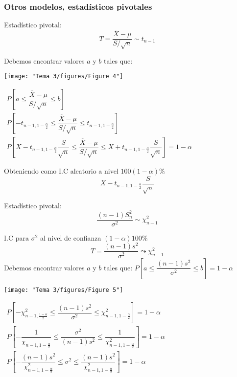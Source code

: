 \subsubsection{Otros modelos, estadísticos pivotales}
 \begin{tcolorbox}[colback=blue!5!white, colframe=blue!75!black, title=\textbf{$X\sim \mathcal{N}(\mu,\sigma^2)$, estimamos $\mu,\sigma$ desconocida}]
Estadístico pivotal: \[
T=\dfrac{\overline{X}-\mu}{S / \sqrt{n} }\sim t_{n-1}
\] 
\end{tcolorbox}

Debemos encontrar valores $a$ y $b$ tales que:

\begin{minipage}{0.45\textwidth}
    \texttt{[image: "Tema 3/figures/Figure 4"]}
\end{minipage}$\begin{array}{l}
    P\left[ a\le \dfrac{\overline{X}-\mu}{S / \sqrt{n} }\le b \right] \\
    P\left[ -t_{n-1,1-\frac{\alpha}{2}}\le \dfrac{\overline{X}-\mu}{S / \sqrt{n} }\le t_{n-1,1-\frac{\alpha}{2} } \right] \\
    P\left[ X-t_{n-1,1-\frac{\alpha}{2} }\dfrac{S}{\sqrt{n} }\le \dfrac{\overline{X}-\mu}{S / \sqrt{n} }\le X+t_{n-1,1-\frac{\alpha}{2} }\dfrac{S}{\sqrt{n} } \right] =1-\alpha
\end{array}$

Obteniendo como I.C aleatorio a nivel $100(1-\alpha)\%$ \[
X-t_{n-1,1-\frac{\alpha}{2} }\dfrac{S}{\sqrt{n} }
\] 
\begin{tcolorbox}[colback=blue!5!white, colframe=blue!75!black, title=\textbf{$X\sim \mathcal{N}(\mu,\sigma^2)$, estimamos $\sigma^2$}]
Estadístico pivotal: \[
\dfrac{(n-1)S_n^2}{\sigma^2}\sim \chi_{n-1}^2
\] 
\end{tcolorbox}
I.C para $\sigma^2$ al nivel de confianza $(1-\alpha)100\%$ \[
T=\dfrac{(n-1)s^2}{\sigma^2}\leadsto \chi_{n-1}^2
\] 
Debemos encontrar valores $a$ y $b$ tales que: $P\left[ a\le \dfrac{(n-1)s^2}{\sigma^2}\le b \right]=1-\alpha $

\begin{minipage}{0.45\textwidth}
    \texttt{[image: "Tema 3/figures/Figure 5"]}
\end{minipage}
$\begin{array}{l}
    P\left[ -\chi_{n-1,\frac{1-\alpha}{2} }^2\le \dfrac{(n-1)s^2}{\sigma^2}\le \chi_{n-1,1-\frac{\alpha}{2} }^2 \right] =1-\alpha\\
    P\left[ -\dfrac{1}{\chi_{n-1,1-\frac{\alpha}{2}}} \le  \dfrac{\sigma^2}{(n-1)s^2}\le \dfrac{1}{\chi_{n-1,1-\frac{\alpha}{2} }^2} \right] =1-\alpha\\
    P\left[ -\dfrac{(n-1)s^2}{\chi_{n-1,1-\frac{\alpha}{2} }^2}\le \sigma^2\le \dfrac{(n-1)s^2}{\chi_{n-1,1-\frac{\alpha}{2} }^2} \right] =1-\alpha
\end{array}$
